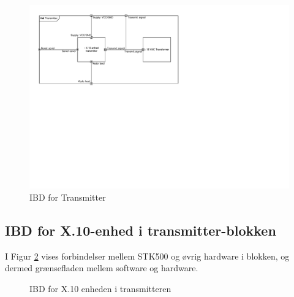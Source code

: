 \begin{figure}[h]
	\centering
	\includegraphics[scale=1,trim=30 335 350 30, clip=true]{Systemarkitektur/Diagrammer/IBD_Transmitter.pdf}
	\caption{IBD for Transmitter}
	\label{fig:IBDtransmitter}
\end{figure}

\subsection{IBD for X.10-enhed i transmitter-blokken}

I Figur \ref{fig:IBDx.10transmit} vises forbindelser mellem STK500 og øvrig hardware i blokken, og dermed grænsefladen mellem software og hardware.

\begin{figure}[h]
	\centering {}
	\caption{IBD for X.10 enheden i transmitteren}
	\label{fig:IBDx.10transmit}
\end{figure}

